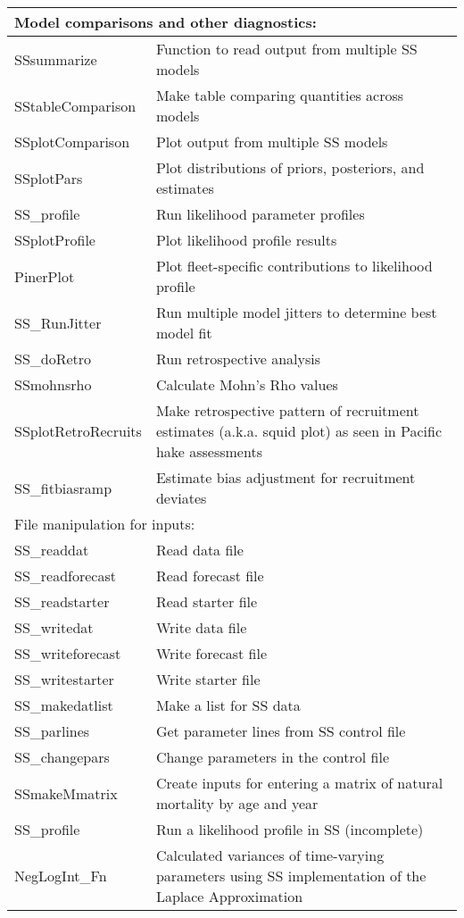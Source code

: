 \begin{center}
\begin{longtable}{p{4.5cm} p{10.52cm}}
		\multicolumn{2}{l}{Model comparisons and other diagnostics:} \Tstrut\Bstrut\\
		\hline
		SSsummarize   \Tstrut & Function to read output from multiple SS models\\
		SStableComparison \Tstrut & Make table comparing quantities across models\\
		SSplotComparison \Tstrut & Plot output from multiple SS models \\
		SSplotPars    \Tstrut & Plot distributions of priors, posteriors, and estimates \\
		SS\_profile \Tstrut & Run likelihood parameter profiles \\
		SSplotProfile \Tstrut & Plot likelihood profile results \\
		PinerPlot     \Tstrut & Plot fleet-specific contributions to likelihood profile \\
		SS\_RunJitter \Tstrut & Run multiple model jitters to determine best model fit \\
		SS\_doRetro \Tstrut & Run retrospective analysis \\
		SSmohnsrho \Tstrut & Calculate Mohn's Rho values\\
		SSplotRetroRecruits \Tstrut & Make retrospective pattern of recruitment estimates (a.k.a. squid plot) as seen in Pacific hake assessments\Bstrut \\
		SS\_fitbiasramp \Tstrut& Estimate bias adjustment for recruitment deviates \Bstrut\\
		\hline
		
		\multicolumn{2}{l}{File manipulation for inputs:}\Tstrut\Bstrut\\
		\hline
		SS\_readdat  \Tstrut & Read data file \\
		SS\_readforecast \Tstrut & Read forecast file \\
		SS\_readstarter  \Tstrut & Read starter file \\
		SS\_writedat  \Tstrut & Write data file \\
		SS\_writeforecast \Tstrut & Write forecast file \\
		SS\_writestarter  \Tstrut & Write starter file \\\Tstrut 
		SS\_makedatlist   \Tstrut & Make a list for SS data \\
		SS\_parlines    \Tstrut & Get parameter lines from SS control file \\
		SS\_changepars  \Tstrut  & Change parameters in the control file \\
		SSmakeMmatrix    \Tstrut & Create inputs for entering a matrix of natural mortality by age and year \\
		SS\_profile      \Tstrut & Run a likelihood profile in SS (incomplete) \\
		NegLogInt\_Fn     \Tstrut& Calculated variances of time-varying parameters using SS implementation of the Laplace Approximation \Bstrut\\
		\hline
		

\end{longtable}
\end{center}
